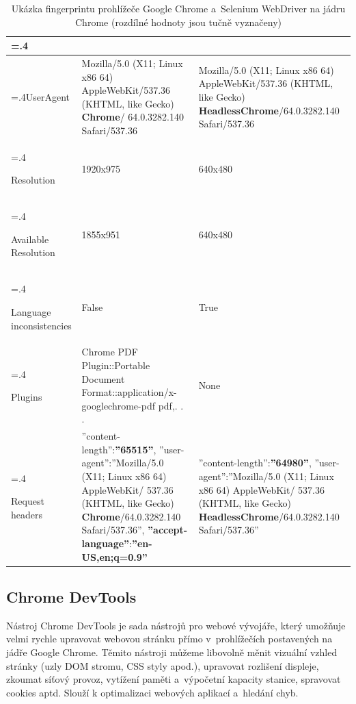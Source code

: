 \begin{table}[ht]
\begin{tabularx}{\linewidth}{
    |>{\hsize=.4\hsize}X|%
    >{\hsize=1.3\hsize}X|%
    >{\hsize=1.3\hsize}X|%
  }
\hline
\multicolumn{1}{|c|}{\textbf{Vlastnost}} & \multicolumn{1}{|c|}{\textbf{Prohlížeč Google Chrome}} & \multicolumn{1}{|c|}{\textbf{Selenium WebDriver Chrome}}\\ \hline

UserAgent & Mozilla/5.0 (X11; Linux x86 64) AppleWebKit/537.36 (KHTML, like Gecko) \textbf{Chrome}/ 64.0.3282.140 Safari/537.36 & Mozilla/5.0 (X11; Linux x86 64)
AppleWebKit/537.36 (KHTML, like Gecko) \textbf{HeadlessChrome}/64.0.3282.140 Safari/537.36 \\ \hline

Resolution & 1920x975  & 640x480 \\ \hline

Available Resolution  & 1855x951 & 640x480 \\ \hline

Language inconsistencies  & False & True \\ \hline

Plugins & Chrome PDF Plugin::Portable Document Format::application/x-googlechrome-pdf pdf,. . . & None \\ \hline

Request headers & ”content-length”:\textbf{”65515”}, ”user-agent”:”Mozilla/5.0 (X11; Linux x86 64) AppleWebKit/ 537.36 (KHTML, like Gecko) \textbf{Chrome}/64.0.3282.140 Safari/537.36”, \textbf{”accept-language”}:\textbf{”en-US,en;q=0.9”} & ”content-length”:\textbf{”64980”},
”user-agent”:”Mozilla/5.0 (X11; Linux x86 64) AppleWebKit/ 537.36 (KHTML, like Gecko) \textbf{HeadlessChrome}/64.0.3282.140
Safari/537.36” \\ \hline

\end{tabularx}

\label{tab:fingerprint_chrome}
\caption{Ukázka fingerprintu prohlížeče Google Chrome a~Selenium WebDriver na jádru Chrome (rozdílné hodnoty jsou tučně vyznačeny)}
\end{table}

\subsection*{Chrome DevTools}
\label{sec:chrome_devtools}
Nástroj Chrome DevTools je sada nástrojů pro webové vývojáře, který umožňuje velmi rychle upravovat webovou stránku přímo v~prohlížečích postavených na jádře Google Chrome. Těmito nástroji můžeme libovolně měnit vizuální vzhled stránky (uzly DOM stromu, CSS styly apod.), upravovat rozlišení displeje, zkoumat síťový provoz, vytížení paměti a~výpočetní kapacity stanice, spravovat cookies aptd. Slouží k optimalizaci webových aplikací a~hledání chyb.

